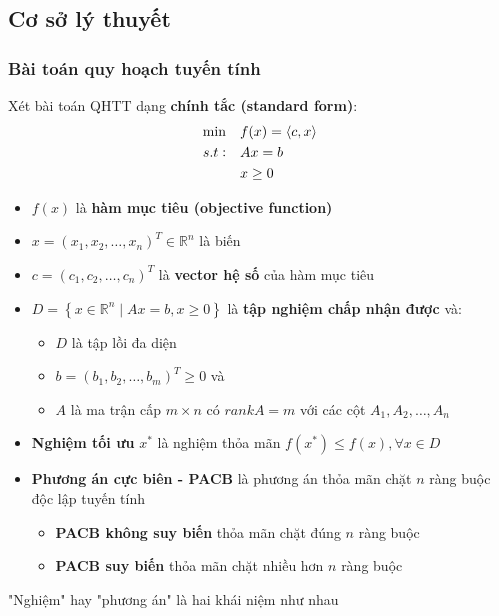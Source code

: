 \documentclass[12pt,a4paper]{article}\author{Nguyễn Nho Dũng}
\newcommand{\kniem}[1]{{\sffamily\bfseries #1}}
\newcommand{\taphop}[1]{\left\{#1\right\}}
\newcommand{\ngoacto}[1]{\left(#1\right)}
\newcommand{\tichvohuong}[2]{\left\langle #1, #2 \right\rangle}
\newcommand{\vectordong}[1]{\ngoacto{#1_1, #1_2, \ldots, #1_n}^T}
\begin{document}
\subsection{Cơ sở lý thuyết}
\subsubsection{Bài toán quy hoạch tuyến tính}
\begin{dnghia}
	Xét bài toán QHTT dạng \kniem{chính tắc (standard form)}:
	\begin{align}
		\min\quad &f(x) = \tichvohuong{c}{x} \\
		s.t:\quad &A x = b\notag\\
		&x \ge 0\notag
	\end{align}
	\begin{itemize}
		\item $f(x)$ là \kniem{hàm mục tiêu (objective function)}
		\item $x = \vectordong{x}\in\mathbb{R}^n$ là biến
		\item $c = \vectordong{c}$ là \kniem{vector hệ số} của hàm mục tiêu
		\item $D = \taphop{x\in\mathbb{R}^n \mid Ax = b, x\ge 0}$ là \kniem{tập nghiệm chấp nhận được} và:
		\begin{itemize}
			\item $D$ là tập lồi đa diện
			\item $b = \left(b_1, b_2, \ldots, b_m\right)^T \ge 0$ và 
			\item $A$ là ma trận cấp $m\times n$ có $rank A = m$ với các cột $A_1, A_2, \ldots, A_n$
		\end{itemize}
		\item \kniem{Nghiệm tối ưu} $x^*$ là nghiệm thỏa mãn $f\ngoacto{x^*} \le f(x), \forall x\in D$
		\item \kniem{Phương án cực biên - PACB} là phương án thỏa mãn chặt $n$ ràng buộc độc lập tuyến tính
		\begin{itemize}
			\item \kniem{PACB không suy biến} thỏa mãn chặt đúng $n$ ràng buộc
			\item \kniem{PACB suy biến} thỏa mãn chặt nhiều hơn $n$ ràng buộc
		\end{itemize}
	\end{itemize}
\end{dnghia}
\begin{chuy}
	"Nghiệm" hay "phương án" là hai khái niệm như nhau
\end{chuy}
\end{document}
